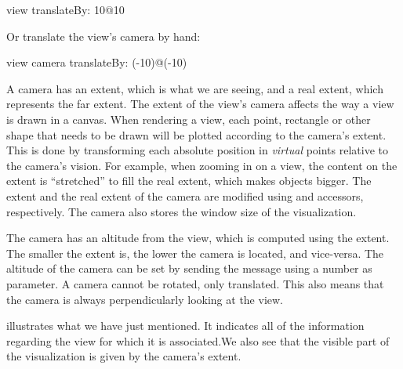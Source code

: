 \documentclass[a4paper,10pt,twoside]{book}
\begin{document}
\begin{code}{}
view translateBy: 10@10
\end{code}

Or translate the view's camera by hand:

\begin{code}{}
view camera translateBy: (-10)@(-10)
\end{code}

A camera has an extent, which is what we are seeing, and a real extent, which represents the far extent.  The extent of the view's camera affects the way a view is drawn in a canvas. When rendering a view, each point, rectangle or other shape that needs to be drawn will be plotted according to the camera's extent. This is done by transforming each absolute position in \emph{virtual} points relative to the camera's vision.
For example, when zooming in on a view, the content on the extent is ``stretched'' to fill the real extent, which makes objects bigger.
The extent and the real extent of the camera are modified using  and  accessors, respectively. The camera also stores the window size of the visualization.

The camera has an altitude from the view, which is computed using the extent. The smaller the extent is, the lower the camera is located, and vice-versa. The altitude of the camera can be set by sending the  message using a number as parameter.
A camera cannot be rotated, only translated. This also means that the camera is always perpendicularly looking at the view.

 illustrates what we have just mentioned. It indicates all of the  information regarding the view for which it is associated.We also see that the visible part of the visualization is given by the camera's extent.
\end{document}
